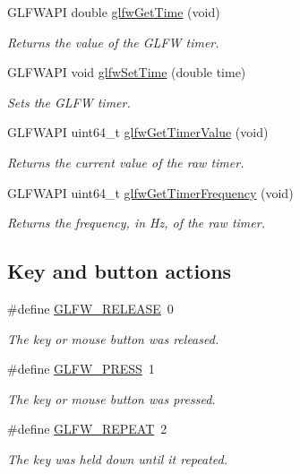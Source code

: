 \begin{DoxyCompactItemize}
G\+L\+F\+W\+A\+PI double \hyperlink{group__input_ga03d4a1039b8662c71eeb40beea8cb622}{glfw\+Get\+Time} (void)
\begin{DoxyCompactList}\small\item\em Returns the value of the G\+L\+FW timer. \end{DoxyCompactList}\item 
G\+L\+F\+W\+A\+PI void \hyperlink{group__input_ga94360a3628a09f32708f83cc3fa48590}{glfw\+Set\+Time} (double time)
\begin{DoxyCompactList}\small\item\em Sets the G\+L\+FW timer. \end{DoxyCompactList}\item 
G\+L\+F\+W\+A\+PI uint64\+\_\+t \hyperlink{group__input_gaa00c3e32227eb70b3968fca0bfe4ae26}{glfw\+Get\+Timer\+Value} (void)
\begin{DoxyCompactList}\small\item\em Returns the current value of the raw timer. \end{DoxyCompactList}\item 
G\+L\+F\+W\+A\+PI uint64\+\_\+t \hyperlink{group__input_gaa92d10b10013372778efbf6367714371}{glfw\+Get\+Timer\+Frequency} (void)
\begin{DoxyCompactList}\small\item\em Returns the frequency, in Hz, of the raw timer. \end{DoxyCompactList}\end{DoxyCompactItemize}
\subsection*{Key and button actions}
\begin{DoxyCompactItemize}
\item 
\#define \hyperlink{group__input_gada11d965c4da13090ad336e030e4d11f}{G\+L\+F\+W\+\_\+\+R\+E\+L\+E\+A\+SE}~0
\begin{DoxyCompactList}\small\item\em The key or mouse button was released. \end{DoxyCompactList}\item 
\#define \hyperlink{group__input_ga2485743d0b59df3791c45951c4195265}{G\+L\+F\+W\+\_\+\+P\+R\+E\+SS}~1
\begin{DoxyCompactList}\small\item\em The key or mouse button was pressed. \end{DoxyCompactList}\item 
\#define \hyperlink{group__input_gac96fd3b9fc66c6f0eebaf6532595338f}{G\+L\+F\+W\+\_\+\+R\+E\+P\+E\+AT}~2
\begin{DoxyCompactList}\small\item\em The key was held down until it repeated. \end{DoxyCompactList}\end{DoxyCompactItemize}
